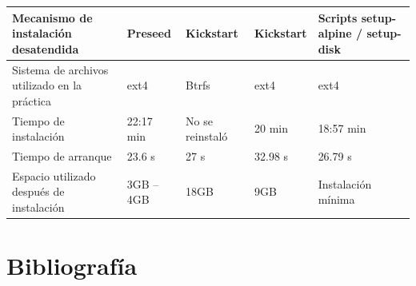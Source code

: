 \documentclass[11pt, letterpaper]{article}
\begin{document}
\begin{center}
\begin{tabular}{|p{3.1cm}|p{2.3cm}|p{2.3cm}|p{2.3cm}|p{2.3cm}|}
Mecanismo de instalación desatendida &
Preseed &
Kickstart &
Kickstart &
Scripts setup-alpine / setup-disk \\
\hline

Sistema de archivos utilizado en la práctica &
ext4 &
Btrfs &
ext4 &
ext4 \\
\hline

Tiempo de instalación &
22:17 min &
No se reinstaló &
20 min &
18:57 min \\
\hline

Tiempo de arranque &
23.6 s &
27 s &
32.98 s &
26.79 s \\
\hline

Espacio utilizado después de instalación &
3GB -- 4GB &
18GB &
9GB &
Instalación mínima \\
\hline

\end{tabular}
\end{center}

\section{Bibliografía}
\label{sec:orga9011da}
\end{document}
